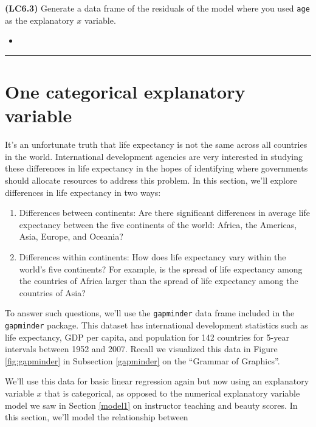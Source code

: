 \documentclass[12pt, krantz2,]{krantz}
\providecommand{\tightlist}{%
  \setlength{\itemsep}{0pt}\setlength{\parskip}{0pt}}
\newenvironment{rmdblock}[1]
  {\begin{shaded*}
  \begin{itemize}
  \renewcommand{\labelitemi}{
    \raisebox{-.7\height}[0pt][0pt]{
    }
  }
  \item
  }
  {
  \end{itemize}
  \end{shaded*}
  }
\newenvironment{learncheck}
  {\begin{rmdblock}{warning}}
  {\end{rmdblock}}
\begin{document}
\textbf{(LC6.3)} Generate a data frame of the residuals of the model where you used \texttt{age} as the explanatory \(x\) variable.

\begin{learncheck}

\end{learncheck}

\begin{center}\rule{0.5\linewidth}{\linethickness}\end{center}

\hypertarget{model2}{%
\section{One categorical explanatory variable}\label{model2}}

It's an unfortunate truth that life expectancy is not the same across all countries in the world. International development agencies are very interested in studying these differences in life expectancy in the hopes of identifying where governments should allocate resources to address this problem. In this section, we'll explore differences in life expectancy in two ways:

\begin{enumerate}
\def\labelenumi{\arabic{enumi}.}
\tightlist
\item
  Differences between continents: Are there significant differences in average life expectancy between the five continents of the world: Africa, the Americas, Asia, Europe, and Oceania?
\item
  Differences within continents: How does life expectancy vary within the world's five continents? For example, is the spread of life expectancy among the countries of Africa larger than the spread of life expectancy among the countries of Asia?
\end{enumerate}

To answer such questions, we'll use the \texttt{gapminder} data frame included in the \texttt{gapminder} package. This dataset has international development statistics such as life expectancy, GDP per capita, and population for 142 countries for 5-year intervals between 1952 and 2007. Recall we visualized this data in Figure \ref{fig:gapminder} in Subsection \ref{gapminder} on the ``Grammar of Graphics''.

We'll use this data for basic linear regression again but now using an explanatory variable \(x\) that is categorical, as opposed to the numerical explanatory variable model we saw in Section \ref{model1} on instructor teaching and beauty scores. In this section, we'll model the relationship between
\end{document}
